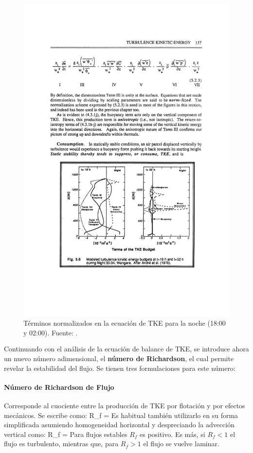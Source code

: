 \begin{figure}[h!]
	\centering
		\includegraphics[width=0.8\linewidth,trim={3.2cm 4.8cm 2.8cm 12.1cm},clip]{Imagenes/03/tke2}
	\caption{Términos normalizados en la ecuación de TKE para la noche (18:00 y 02:00). Fuente: \cite{stull1988introduction}.}
	\label{fig:03_tke2}
\end{figure}
 
Continuando con el análisis de la ecuación de balance de TKE, se introduce ahora un nuevo número adimensional, el \textbf{número de Richardson}, el cual permite revelar la estabilidad del flujo. Se tienen tres formulaciones para este número:

\paragraph{Número de Richardson de Flujo} Corresponde al cuociente entre la producción de TKE por flotación y por efectos mecánicos. Se escribe como:
\be R_f =  \ee
Es habitual también utilizarlo en su forma simplificada asumiendo homogeneidad horizontal y despreciando la advección vertical como:
\be R_f =  \ee
Para flujos estables $R_f$ es positivo. Es más, si $R_f < 1$ el flujo es turbulento, mientras que, para $R_f>1$ el flujo se vuelve laminar.
